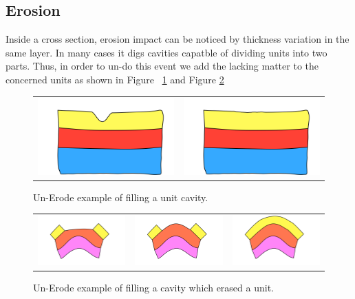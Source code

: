 \documentclass[12pt, a4paper]{memoir} %
\begin{document}
\subsection{Erosion}
Inside a cross section, erosion impact can be noticed by thickness variation in the same layer.
In many cases it digs cavities capatble of dividing units into two parts. Thus, in order to un-do this event we add the lacking matter to the concerned units as shown in Figure ~\ref{unerodeeg} and Figure \ref{unerodecveg}

\begin{figure}[htb]
\centering
\begin{tabular}{@{}cc@{}}
\includegraphics[width=.35\textwidth]{unErodeUpDescription0.png}&
\includegraphics[width=.35\textwidth]{unErodeUpDescription1.png}\\
\end{tabular}
\caption{Un-Erode example of filling a unit cavity.}
\label{unerodeeg}
\end{figure}

\begin{figure}[htb]
\centering
\begin{tabular}{@{}ccc@{}}
\includegraphics[width=.35\textwidth]{unErodeConvexDescription0.png}&
\includegraphics[width=.35\textwidth]{unErodeConvexDescription1.png}&
\includegraphics[width=.35\textwidth]{unErodeConvexDescription2.png}\\
\end{tabular}
\caption{Un-Erode example of filling a cavity which erased a unit.}
\label{unerodecveg}
\end{figure}
\end{document}
